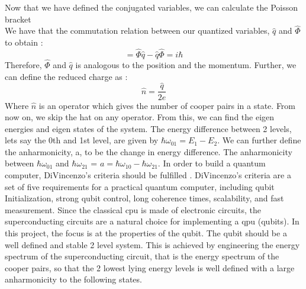     Now that we have defined the conjugated variables, we can calculate the Poisson bracket
    \\
    We have that the commutation relation between our quantized  variables, $\hat{q}$ and $\hat{\Phi}$ to obtain \cite{Girvin2014}:
    \begin{equation}
        [\hat{\Phi}, \hat{q}] = \hat{\Phi} \hat{q} -\hat{q} \hat{\Phi} = i \hbar
    \end{equation}
    Therefore, $\hat{\Phi}$ and $\hat{q}$ is analogous to the position and the momentum. Further, we can define the reduced charge as \cite{Girvin2014}: 
    \begin{equation}
        \hat{n} = \frac{\hat{q}}{2e}
    \end{equation}
    Where $\hat{n}$ is an operator which gives the number of cooper pairs in a state. From now on, we skip the hat on any operator. From this, we can find the eigen energies and eigen states of the system. The energy difference between 2 levels, lets say the 0th and 1st level, are given by $\hbar \omega_{01} = E_1 - E_2 $. We can further define the anharmonicity, a, to be the change in energy difference. The anharmonicity between $\hbar\omega_{01}$ and $\hbar\omega_{21}$ = $a = \hbar\omega_{10}-\hbar\omega_{21}$. 
    \newline
    \newline
    In order to build a quantum computer, DiVincenzo's criteria should be fulfilled \cite{DiVincenzo2000}. DiVincenzo's criteria are a set of five requirements for a practical quantum computer, including qubit Initialization, strong qubit control, long coherence times, scalability, and fast measurement. Since the classical \acrshort{cpu} is made of electronic circuits, the superconducting circuits are a natural choice for implementing a \acrshort{qpu} (qubits). In this project, the focus is at the properties of the qubit. The qubit should be a well defined and stable 2 level system. This is achieved by engineering the energy spectrum of the superconducting circuit, that is the energy spectrum of the cooper pairs, so that the 2 lowest lying energy levels is well defined with a large anharmonicity to the following states.
